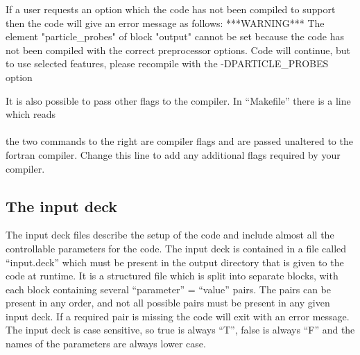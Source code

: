 \documentclass[12pt,a4paper]{article}
\newcommand{\inlinecode}[1]{{\color{warwickred} \bf\texttt{#1}}}
\newcommand{\EPOCH}{{\color{warwickdark}\fontfamily{phv}\selectfont{EPOCH}}}
\newenvironment{boxverbatim}{\lboxverbatim{none}}{\endlboxverbatim}
\begin{document}
If a user requests an option which the code has not been compiled to support
then the code will give an error message as follows:
\begin{boxverbatim}
 ***WARNING***
 The element "particle_probes" of block "output" cannot be set
 because the code has not been compiled with the correct preprocessor options.
 Code will continue, but to use selected features, please recompile with the
 -DPARTICLE_PROBES option
\end{boxverbatim}

It is also possible to pass other flags to the compiler. In ``Makefile'' there
is a line which reads\\
\indent\inlinecode{FFLAGS = -O3 -fast}\\
the two commands to the right are compiler flags and are passed unaltered to
the fortran compiler. Change this line to add any additional flags required by
your compiler.

\subsection{The {\EPOCH} input deck}
The input deck files describe the setup of the code and
include almost all the controllable parameters for the code. The input deck is
contained in a file called ``input.deck'' which must be present in the output
directory that is given to the code at runtime. It is a structured
file which is split into separate blocks, with each block containing several
``parameter'' = ``value'' pairs. The pairs can be present in any order, and not
all possible pairs must be present in any given input deck. If a required pair
is missing the code will exit with an error message. The input deck is case
sensitive, so true is always ``T'', false is always ``F'' and the names of
the parameters are always lower case.\\
\end{document}
